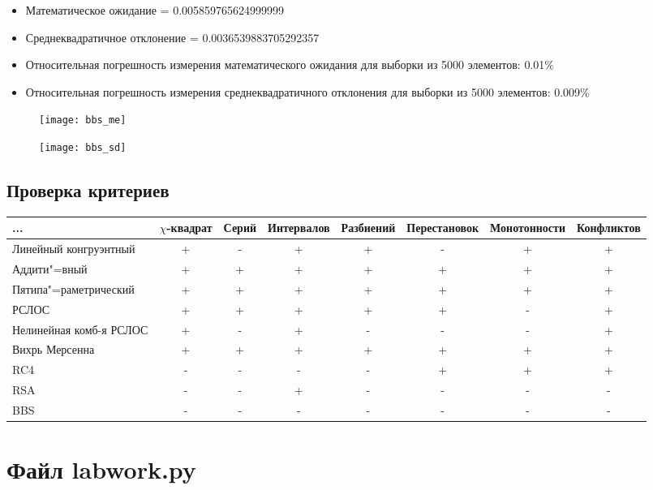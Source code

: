 \documentclass[spec, och, labwork]{SCWorks}
\begin{document}
\begin{itemize}
  \item Математическое ожидание = 0.005859765624999999
  \item Среднеквадратичное отклонение = 0.0036539883705292357
  \item Относительная погрешность измерения математического ожидания для выборки из 5000 элементов: 0.01\%
  \item Относительная погрешность измерения среднеквадратичного отклонения для выборки из 5000 элементов: 0.009\%
\end{itemize}

\begin{figure}[H]
  \centering
  \texttt{[image: bbs\_me]}
\end{figure}
\begin{figure}[H]
  \centering
  \texttt{[image: bbs\_sd]}
\end{figure}

\subsection{Проверка критериев}

\begin{table}[H]
  \centering
  \footnotesize
  \begin{tabular}{|p{1.7cm}|c|c|c|c|c|c|c|}
    \hline
    ... & $\chi$-квадрат & Серий & Интервалов & Разбиений & Перестановок & Монотонности & Конфликтов \\ \hline
    Линейный конгруэнтный   & + & - & + & + & - & + & + \\ \hline
    Аддити"=вный            & + & + & + & + & + & + & + \\ \hline
    Пятипа"=раметрический   & + & + & + & + & + & + & + \\ \hline
    РСЛОС                   & + & + & + & + & + & - & + \\ \hline
    Нелинейная комб-я РСЛОС & + & - & + & - & - & - & + \\ \hline
    Вихрь Мерсенна          & + & + & + & + & + & + & + \\ \hline
    RC4                     & - & - & - & - & + & + & + \\ \hline
    RSA                     & - & - & + & - & - & - & - \\ \hline
    BBS                     & - & - & - & - & - & - & - \\ \hline
  \end{tabular}
\end{table}


\appendix

\section{Файл labwork.py}
\inputminted{python}{labwork.py}
\end{document}
